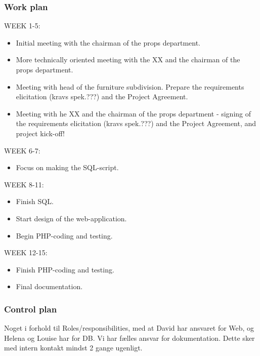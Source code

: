\documentclass[12pt]{article}
\begin{document}
\subsubsection{Work plan}
WEEK 1-5:
\begin{itemize}
\item Initial meeting with the chairman of the props department.
\item More technically oriented meeting with the XX and the chairman of the props department.
\item Meeting with head of the furniture subdivision.
Prepare the requirements elicitation (kravs spek.???) and the Project Agreement.
\item Meeting with he XX and the chairman of the props department - signing of the requirements elicitation (kravs spek.???) and the Project Agreement, and project kick-off!
\end{itemize}
WEEK 6-7: 
\begin{itemize}
\item Focus on making the SQL-script.
\end{itemize}
WEEK 8-11: 
\begin{itemize}
\item Finish SQL.
\item Start design of the web-application.
\item Begin PHP-coding and testing.
\end{itemize}
WEEK 12-15:
\begin{itemize}
\item Finish PHP-coding and testing.
\item Final documentation. 
\end{itemize}
\subsubsection{Control plan}
Noget i forhold til Roles/responsibilities, med at David har ansvaret for Web, og Helena og Louise har for DB. Vi har fælles ansvar for dokumentation. Dette sker med intern kontakt mindst 2 gange ugenligt.
\end{document}
